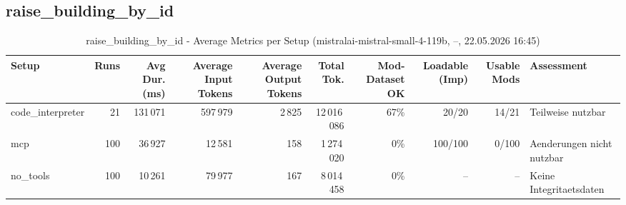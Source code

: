 \documentclass[a4paper,11pt]{article}
\begin{document}
\clearpage

\subsection{raise\_building\_by\_id}

\begin{table}[H]
\centering
\scriptsize
\caption{raise\_building\_by\_id - Average Metrics per Setup (mistralai-mistral-small-4-119b, --, 22.05.2026 16:45)}
\label{tab:combined\_raise\_building\_by\_id\_metrics\_20260522}
\begin{tabular}{l r r r r r r r r l}
\toprule
Setup & Runs & Avg Dur. (ms) & Average Input Tokens & Average Output Tokens & Total Tok. & Mod-Dataset OK & Loadable (Imp) & Usable Mods & Assessment \\
\midrule
code\_interpreter & 21 & 131\,071 & 597\,979 & 2\,825 & 12\,016\,086 & 67\% & 20/20 & 14/21 & Teilweise nutzbar \\
mcp & 100 & 36\,927 & 12\,581 & 158 & 1\,274\,020 & 0\% & 100/100 & 0/100 & Aenderungen nicht nutzbar \\
no\_tools & 100 & 10\,261 & 79\,977 & 167 & 8\,014\,458 & 0\% & -- & -- & Keine Integritaetsdaten \\
\bottomrule
\end{tabular}
\end{table}
\end{document}
